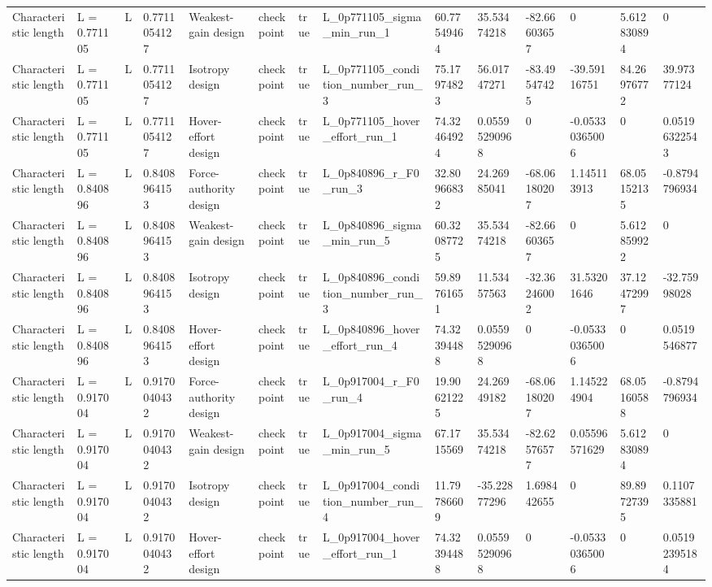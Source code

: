 \begin{tabular}{@{}llllllllllllll@{}}
Characteristic length & L = 0.771105 & L & 0.7711054127 & Weakest-gain design & checkpoint & true & L\_0p771105\_sigma\_min\_run\_1 & 60.77549464 & 35.53474218 & -82.66603657 & 0 & 5.612830894 & 0 \\
Characteristic length & L = 0.771105 & L & 0.7711054127 & Isotropy design & checkpoint & true & L\_0p771105\_condition\_number\_run\_3 & 75.17974823 & 56.01747271 & -83.49547425 & -39.59116751 & 84.26976772 & 39.97377124 \\
Characteristic length & L = 0.771105 & L & 0.7711054127 & Hover-effort design & checkpoint & true & L\_0p771105\_hover\_effort\_run\_1 & 74.32464924 & 0.05595290968 & 0 & -0.05330365006 & 0 & 0.05196322543 \\
Characteristic length & L = 0.840896 & L & 0.8408964153 & Force-authority design & checkpoint & true & L\_0p840896\_r\_F0\_run\_3 & 32.80966832 & 24.26985041 & -68.06180207 & 1.145113913 & 68.05152135 & -0.8794796934 \\
Characteristic length & L = 0.840896 & L & 0.8408964153 & Weakest-gain design & checkpoint & true & L\_0p840896\_sigma\_min\_run\_5 & 60.32087725 & 35.53474218 & -82.66603657 & 0 & 5.612859922 & 0 \\
Characteristic length & L = 0.840896 & L & 0.8408964153 & Isotropy design & checkpoint & true & L\_0p840896\_condition\_number\_run\_3 & 59.89761651 & 11.53457563 & -32.36246002 & 31.53201646 & 37.12472997 & -32.75998028 \\
Characteristic length & L = 0.840896 & L & 0.8408964153 & Hover-effort design & checkpoint & true & L\_0p840896\_hover\_effort\_run\_4 & 74.32394488 & 0.05595290968 & 0 & -0.05330365006 & 0 & 0.0519546877 \\
Characteristic length & L = 0.917004 & L & 0.9170040432 & Force-authority design & checkpoint & true & L\_0p917004\_r\_F0\_run\_4 & 19.90621225 & 24.26949182 & -68.06180207 & 1.145224904 & 68.05160588 & -0.8794796934 \\
Characteristic length & L = 0.917004 & L & 0.9170040432 & Weakest-gain design & checkpoint & true & L\_0p917004\_sigma\_min\_run\_5 & 67.1715569 & 35.53474218 & -82.62576577 & 0.05596571629 & 5.612830894 & 0 \\
Characteristic length & L = 0.917004 & L & 0.9170040432 & Isotropy design & checkpoint & true & L\_0p917004\_condition\_number\_run\_4 & 11.79786609 & -35.22877296 & 1.698442655 & 0 & 89.89727395 & 0.1107335881 \\
Characteristic length & L = 0.917004 & L & 0.9170040432 & Hover-effort design & checkpoint & true & L\_0p917004\_hover\_effort\_run\_1 & 74.32394488 & 0.05595290968 & 0 & -0.05330365006 & 0 & 0.05192395184 \\

\end{tabular}
